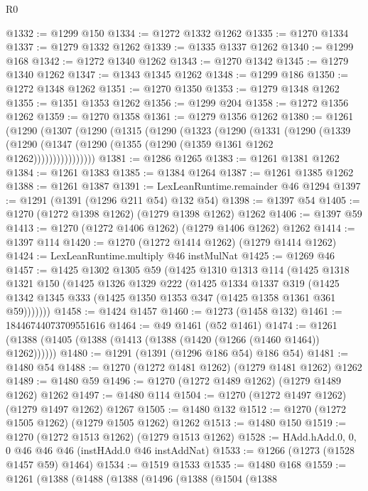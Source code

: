 \begin{lexlean}{R0}
\begin{coremodule}
@1332 := @1299 @150
@1334 := @1272 @1332 @1262
@1335 := @1270 @1334
@1337 := @1279 @1332 @1262
@1339 := @1335 @1337 @1262
@1340 := @1299 @168
@1342 := @1272 @1340 @1262
@1343 := @1270 @1342
@1345 := @1279 @1340 @1262
@1347 := @1343 @1345 @1262
@1348 := @1299 @186
@1350 := @1272 @1348 @1262
@1351 := @1270 @1350
@1353 := @1279 @1348 @1262
@1355 := @1351 @1353 @1262
@1356 := @1299 @204
@1358 := @1272 @1356 @1262
@1359 := @1270 @1358
@1361 := @1279 @1356 @1262
@1380 := @1261
    (@1290
      (@1307
        (@1290
          (@1315
            (@1290
              (@1323
                (@1290
                  (@1331
                    (@1290
                      (@1339
                        (@1290 (@1347 (@1290 (@1355 (@1290 (@1359 @1361 @1262 @1262))))))))))))))))
@1381 := @1286 @1265
@1383 := @1261 @1381 @1262
@1384 := @1261 @1383
@1385 := @1384 @1264
@1387 := @1261 @1385 @1262
@1388 := @1261 @1387
@1391 := LexLeanRuntime.remainder @46 @1294
@1397 := @1291 (@1391 (@1296 @211 @54) @132 @54)
@1398 := @1397 @54
@1405 := @1270 (@1272 @1398 @1262) (@1279 @1398 @1262) @1262
@1406 := @1397 @59
@1413 := @1270 (@1272 @1406 @1262) (@1279 @1406 @1262) @1262
@1414 := @1397 @114
@1420 := @1270 (@1272 @1414 @1262) (@1279 @1414 @1262)
@1424 := LexLeanRuntime.multiply @46 instMulNat
@1425 := @1269 @46
@1457 := @1425
    @1302
    @1305
    @59
    (@1425
      @1310
      @1313
      @114
      (@1425
        @1318
        @1321
        @150
        (@1425
          @1326
          @1329
          @222
          (@1425
            @1334
            @1337
            @319
            (@1425 @1342 @1345 @333 (@1425 @1350 @1353 @347 (@1425 @1358 @1361 @361 @59)))))))
@1458 := @1424 @1457
@1460 := @1273 (@1458 @132)
@1461 := 18446744073709551616
@1464 := @49 @1461 (@52 @1461)
@1474 := @1261 (@1388 (@1405 (@1388 (@1413 (@1388 (@1420 (@1266 (@1460 @1464)) @1262))))))
@1480 := @1291 (@1391 (@1296 @186 @54) @186 @54)
@1481 := @1480 @54
@1488 := @1270 (@1272 @1481 @1262) (@1279 @1481 @1262) @1262
@1489 := @1480 @59
@1496 := @1270 (@1272 @1489 @1262) (@1279 @1489 @1262) @1262
@1497 := @1480 @114
@1504 := @1270 (@1272 @1497 @1262) (@1279 @1497 @1262) @1267
@1505 := @1480 @132
@1512 := @1270 (@1272 @1505 @1262) (@1279 @1505 @1262) @1262
@1513 := @1480 @150
@1519 := @1270 (@1272 @1513 @1262) (@1279 @1513 @1262)
@1528 := HAdd.hAdd.{0, 0, 0} @46 @46 @46 (instHAdd.{0} @46 instAddNat)
@1533 := @1266 (@1273 (@1528 @1457 @59) @1464)
@1534 := @1519 @1533
@1535 := @1480 @168
@1559 := @1261
    (@1388
      (@1488
        (@1388
          (@1496
            (@1388
              (@1504
                (@1388

\end{coremodule}
\end{lexlean}
